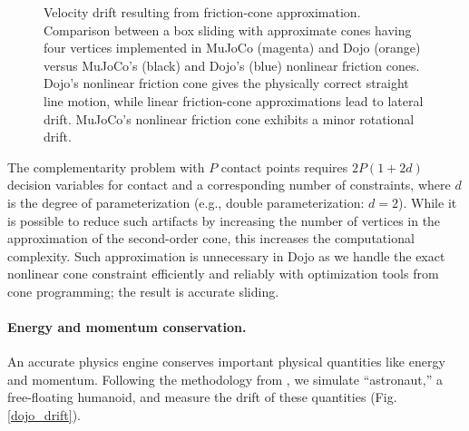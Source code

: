 \begin{figure}[H]
	\begin{center}
	\end{center}
	\caption[Velocity drift comparison between linearized and second-order friction cones]{Velocity drift resulting from friction-cone approximation. Comparison between a box sliding with approximate cones having four vertices implemented in MuJoCo (magenta) and Dojo (orange) versus MuJoCo's (black) and Dojo's (blue) nonlinear friction cones. Dojo's nonlinear friction cone gives the physically correct straight line motion, while linear friction-cone approximations lead to lateral drift. MuJoCo's nonlinear friction cone exhibits a minor rotational drift.}
	\label{dojo_velocity_drift}
\end{figure}

The complementarity problem with $P$ contact points requires $2 P (1 + 2 d)$ decision variables for contact and a corresponding number of constraints, where $d$ is the degree of parameterization (e.g., double parameterization: $d=2$). While it is possible to reduce such artifacts by increasing the number of vertices in the approximation of the second-order cone, this increases the computational complexity. Such approximation is unnecessary in Dojo as we handle the exact nonlinear cone constraint efficiently and reliably with optimization tools from cone programming; the result is accurate sliding.

\paragraph{Energy and momentum conservation.}

An accurate physics engine conserves important physical quantities like energy and momentum. Following the methodology from \cite{erez2015simulation}, we simulate ``astronaut,'' a free-floating humanoid, and measure the drift of these quantities (Fig. \ref{dojo_drift}). 

